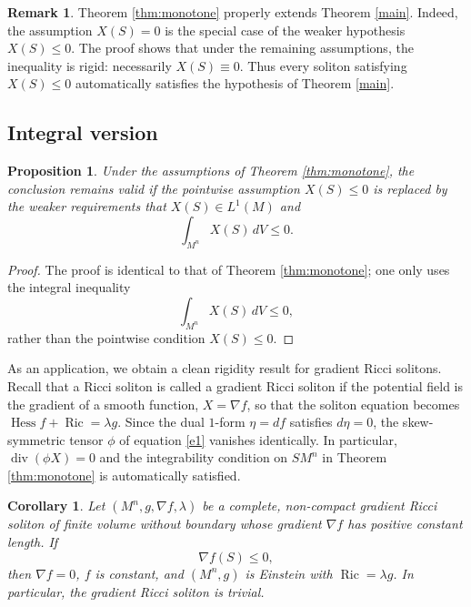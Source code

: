 \documentclass[a4paper, twoside, 10pt]{article}
\numberwithin{equation}{section}
\newtheorem{corollary}{Corollary}[section]
\newtheorem{proposition}{Proposition}[section]
\theoremstyle{definition}
\newtheorem{remark}{Remark}[section]
\begin{document}
\bigskip


\begin{remark}
Theorem \ref{thm:monotone} properly extends Theorem \ref{main}. Indeed,
the assumption \(X(S)=0\) is the special case of the weaker hypothesis
\(X(S)\le0\). The proof shows that under the remaining assumptions,
the inequality is rigid: necessarily \(X(S)\equiv0\). Thus every
soliton satisfying \(X(S)\le0\) automatically satisfies the hypothesis
of Theorem \ref{main}.
\end{remark}



\subsection{Integral version}

\begin{proposition}\label{prop:integral-monotone}
Under the assumptions of Theorem \ref{thm:monotone}, the conclusion
remains valid if the pointwise assumption \(X(S)\le0\) is replaced by
the weaker requirements that \(X(S)\in L^1(M)\) and
\[
\int_{M^n}X(S)\,dV\le0.
\]
\end{proposition}


\begin{proof}
The proof is identical to that of Theorem
\ref{thm:monotone}; one only uses the integral inequality
\[
\int_{M^n}X(S)\,dV\le0,
\]
rather than the pointwise condition \(X(S)\le0\).
\end{proof}

As an application, we obtain a clean rigidity result for gradient Ricci
solitons. Recall that a Ricci soliton is called a gradient Ricci
soliton if the potential field is the gradient of a smooth function,
$X=\nabla f$, so that the soliton equation becomes
$\operatorname{Hess}f+\operatorname{Ric}=\lambda g$. Since the dual
$1$-form $\eta=df$ satisfies $d\eta=0$, the skew-symmetric tensor
$\phi$ of equation \eqref{e1} vanishes identically. In particular,
$\operatorname{div}(\phi X)=0$ and the integrability condition on
$SM^{n}$ in Theorem \ref{thm:monotone} is automatically satisfied.

\begin{corollary}\label{cor:gradient}
Let $(M^{n},g,\nabla f,\lambda)$ be a complete, non-compact gradient
Ricci soliton of finite volume without boundary whose gradient \(\nabla f\) has positive constant length. If
\[
\nabla f(S)\leq 0,
\]
then $\nabla f=0$, $f$ is constant, and $(M^{n},g)$ is Einstein with
$\operatorname{Ric}=\lambda g$. In particular, the gradient Ricci
soliton is trivial.
\end{corollary}
\end{document}
